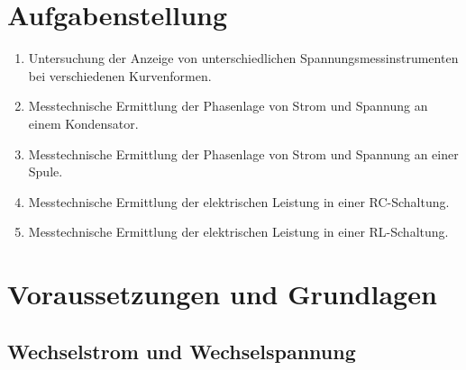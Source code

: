 \documentclass{article}
\begin{document}
\parindent0cm




\pagestyle{fancy}

\tableofcontents
\newpage
\section{Aufgabenstellung}

\begin{enumerate}
\item Untersuchung  der  Anzeige  von  unterschiedlichen  Spannungsmessinstrumenten  bei verschiedenen Kurvenformen.
\item Messtechnische Ermittlung der Phasenlage von Strom und Spannung an einem Kondensator.
\item Messtechnische Ermittlung der Phasenlage von Strom und Spannung an einer Spule.
\item Messtechnische Ermittlung der elektrischen Leistung in einer RC-Schaltung.
\item Messtechnische Ermittlung der elektrischen Leistung in einer RL-Schaltung.
\end{enumerate}

\section{Voraussetzungen und Grundlagen}

\subsection{Wechselstrom und Wechselspannung}
\end{document}
